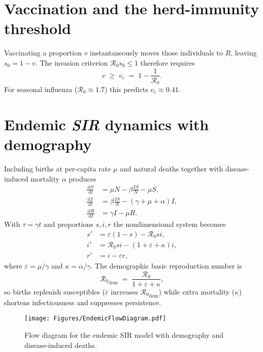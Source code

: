 \documentclass[11pt]{article}
\newcommand{\dd}{\,\mathrm{d}}
\newcommand{\RR}{\mathcal{R}_0}
\begin{document}
\section{Vaccination and the herd-immunity threshold}\label{sec:Vaccination}

Vaccinating a proportion $v$ instantaneously moves those individuals to
$R$, leaving $s_0=1-v$.  The invasion criterion $\RR s_0\le1$ therefore
requires
\begin{equation*}
  v \;\ge\; v_c \;=\; 1-\frac{1}{\RR}.
\end{equation*}
For seasonal influenza ($\RR\approx1.7$) this predicts
$v_c\approx0.41$.
\section{Endemic \textit{SIR} dynamics with demography}\label{sec:Endemic}

Including births at per-capita rate $\mu$ and natural deaths together
with disease-induced mortality $\alpha$ produces
\begin{align*}
  \frac{\dd S}{\dd t} &= \mu N - \beta \frac{I S}{N} - \mu S, \\
  \frac{\dd I}{\dd t} &= \beta \frac{I S}{N} - (\gamma+\mu+\alpha)I, \\
  \frac{\dd R}{\dd t} &= \gamma I - \mu R .
\end{align*}
With $\tau=\gamma t$ and proportions
$s,i,r$ the nondimensional system becomes
\begin{align*}
  s' &= \varepsilon(1-s) - \RR s i, \\
  i' &= \RR s i - (1+\varepsilon+\kappa)i, \\
  r' &= i - \varepsilon r,
\end{align*}
where $\varepsilon=\mu/\gamma$ and $\kappa=\alpha/\gamma$.
The demographic basic reproduction number is
\begin{equation}\label{eq:R0dem}
  {\RR}_{\mathrm{dem}}
  \;=\;
  \frac{\RR}{1+\varepsilon+\kappa},
\end{equation}
so births replenish susceptibles ($\varepsilon$ increases
${\RR}_{\mathrm{dem}}$) while extra mortality ($\kappa$) shortens
infectiousness and suppresses persistence.

\begin{figure}[H]
  \centering
  \texttt{[image: Figures/EndemicFlowDiagram.pdf]}
  \caption{Flow diagram for the endemic SIR model with demography and
           disease-induced deaths.}
  \label{fig:flowdiagram}
\end{figure}



\end{document}

